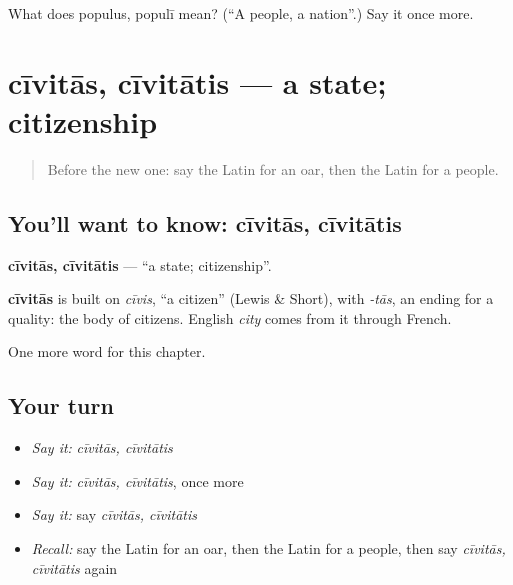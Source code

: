 \begin{tcolorbox}[breakable,colback=teal!4,colframe=teal!35!black,title={Before you move on}]
What does populus, populī mean? (\textquotedblleft{}A people, a nation\textquotedblright{}.) Say it once more.
\end{tcolorbox}
\section[cīvitās, cīvitātis]{cīvitās, cīvitātis — a state; citizenship}

\label{lesson:LA-C271-civitas}



\begin{quote}
Before the new one: say the Latin for an oar, then the Latin for a people.
\end{quote}

\subsection*{You'll want to know: cīvitās, cīvitātis}
\textbf{cīvitās, cīvitātis} — \textquotedblleft{}a state; citizenship\textquotedblright{}.

\begin{cousinweb}
\textbf{cīvitās} is built on \emph{cīvis}, \textquotedblleft{}a citizen\textquotedblright{} (Lewis \& Short), with \emph{-tās}, an ending for a quality: the body of citizens. English \emph{city} comes from it through French.
\end{cousinweb}

\begin{grammarlens}[title={What you've built}]
One more word for this chapter.
\end{grammarlens}

\subsection*{Your turn}
\begin{itemize}
\raggedright
  \item \emph{Say it:} \emph{cīvitās, cīvitātis}
  \item \emph{Say it:} \emph{cīvitās, cīvitātis}, once more
  \item \emph{Say it:} say \emph{cīvitās, cīvitātis}
  \item \emph{Recall:} say the Latin for an oar, then the Latin for a people, then say \emph{cīvitās, cīvitātis} again
\end{itemize}

